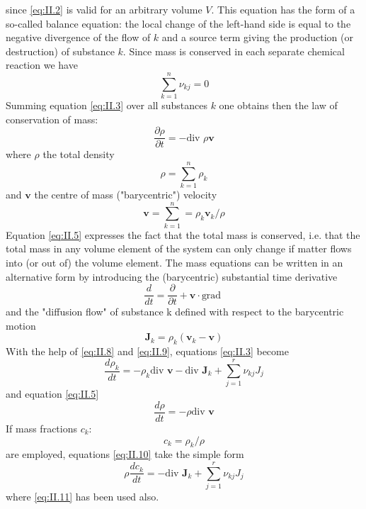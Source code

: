 since \eqref{eq:II.2} is valid for an arbitrary volume $V$. This equation has the form of a so-called balance equation: the local change of the left-hand side is equal to the negative divergence of the flow of $k$ and a source term giving the production (or destruction) of substance $k$. Since mass is conserved in each separate chemical reaction we have
\begin{equation}
\sum_{k=1}^{n} \nu_{kj} = 0
    \label{eq:II.4}
\end{equation}
Summing equation \eqref{eq:II.3} over all substances $k$ one obtains then the law of conservation of mass:
\begin{equation}
\frac{\partial \rho}{\partial t} = - \textrm{div } \rho \bm{v}
    \label{eq:II.5}
\end{equation}
where $\rho$ the total density
\begin{equation}
    \rho = \sum_{k=1}^{n} \rho_k
    \label{eq:II.6}
\end{equation}
and $\bm{v}$ the centre of mass ("barycentric") velocity
\begin{equation}
\bm{v} = \sum_{k=1}^{n} = \rho_k \bm{v}_k / \rho
    \label{eq:II.7}
\end{equation}
Equation \eqref{eq:II.5} expresses the fact that the total mass is conserved, i.e. that the total mass in any volume element of the system can only change if matter flows into (or out of) the volume element.
The mass equations can be written in an alternative form by introducing
the (barycentric) substantial time derivative
\begin{equation}
\frac{d}{d t} = \frac{\partial }{\partial t} + \bm{v} \cdot \textrm{grad }
    \label{eq:II.8}
\end{equation}
and the "diffusion flow" of substance k defined with respect to the
barycentric motion
\begin{equation}
\bm{J}_k = \rho_k \left( \bm{v}_k - \bm{v} \right)
    \label{eq:II.9}
\end{equation}
With the help of \eqref{eq:II.8} and \eqref{eq:II.9}, equations \eqref{eq:II.3} become
\begin{equation}
\frac{d \rho_k}{d t} = - \rho_k \textrm{div } \bm{v} - \textrm{div } \bm{J}_k + \sum_{j=1}^r \nu_{kj} J_j
    \label{eq:II.10}
\end{equation}
and equation \eqref{eq:II.5}
\begin{equation}
\frac{d \rho}{d t} = - \rho \textrm{div } \bm{v}
    \label{eq:II.11}
\end{equation}
If mass fractions $c_k$:
\begin{equation}
    c_k = \rho_k / \rho
    \label{eq:II.12}
\end{equation}
are employed, equations \eqref{eq:II.10} take the simple form
\begin{equation}
    \rho \frac{d c_k}{d t} = - \textrm{div } \bm{J}_k + \sum_{j=1}^r \nu_{kj} J_j
    \label{eq:II.13}
\end{equation}
where \eqref{eq:II.11} has been used also.

